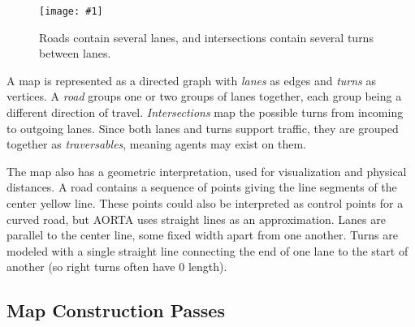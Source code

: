 \documentclass[letterpaper, 10 pt, conference]{ieeeconf}  %
\newcommand{\pix}[3]{
  \begin{figure}[h]
    \centering \texttt{[image: \#1]}
    \caption{#2}
  \end{figure}
}
\begin{document}
\pix{map_model.png}
    {Roads contain several lanes, and intersections contain several turns
     between lanes.}
    {scale=0.5}

A map is represented as a directed graph with \emph{lanes} as edges and
\emph{turns} as vertices. A \emph{road} groups one or two groups of lanes
together, each group being a different direction of travel.
\emph{Intersections} map the possible turns from incoming to outgoing lanes.
Since both lanes and turns support traffic, they are grouped together as
\emph{traversables}, meaning agents may exist on them.

The map also has a geometric interpretation, used for visualization and physical
distances. A road contains a sequence of points giving the line segments of the
center yellow line. These points could also be interpreted as control points for
a curved road, but AORTA uses straight lines as an approximation. Lanes are
parallel to the center line, some fixed width apart from one another. Turns are
modeled with a single straight line connecting the end of one lane to the start
of another (so right turns often have $0$ length). 

\subsection{Map Construction Passes}
\end{document}
